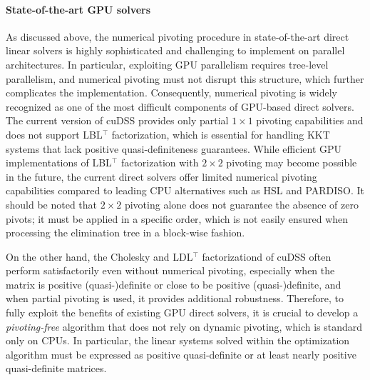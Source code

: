 \documentclass{article}
\begin{document}
\paragraph{State-of-the-art GPU solvers}
As discussed above, the numerical pivoting procedure in state-of-the-art direct linear solvers is highly sophisticated and challenging to implement on parallel architectures.
In particular, exploiting GPU parallelism requires tree-level parallelism, and numerical pivoting must not disrupt this structure, which further complicates the implementation.
Consequently, numerical pivoting is widely recognized as one of the most difficult components of GPU-based direct solvers.
The current version of cuDSS provides only partial $1 \times 1$ pivoting capabilities and does not support LBL$^\top$ factorization, which is essential for handling KKT systems that lack positive quasi-definiteness guarantees.
While efficient GPU implementations of LBL$^\top$ factorization with $2 \times 2$ pivoting may become possible in the future, the current direct solvers offer limited numerical pivoting capabilities compared to leading CPU alternatives such as HSL and PARDISO.
It should be noted that $2 \times 2$ pivoting alone does not guarantee the absence of zero pivots; it must be applied in a specific order, which is not easily ensured when processing the elimination tree in a block-wise fashion.

On the other hand, the Cholesky and LDL$^\top$ factorizationd of cuDSS often perform satisfactorily even without numerical pivoting, especially when the matrix is positive (quasi-)definite or close to be positive (quasi-)definite, and when partial pivoting is used, it provides additional robustness.
Therefore, to fully exploit the benefits of existing GPU direct solvers, it is crucial to develop a \emph{pivoting-free} algorithm that does not rely on dynamic pivoting, which is standard only on CPUs.
In particular, the linear systems solved within the optimization algorithm must be expressed as positive quasi-definite or at least nearly positive quasi-definite matrices.
\end{document}
